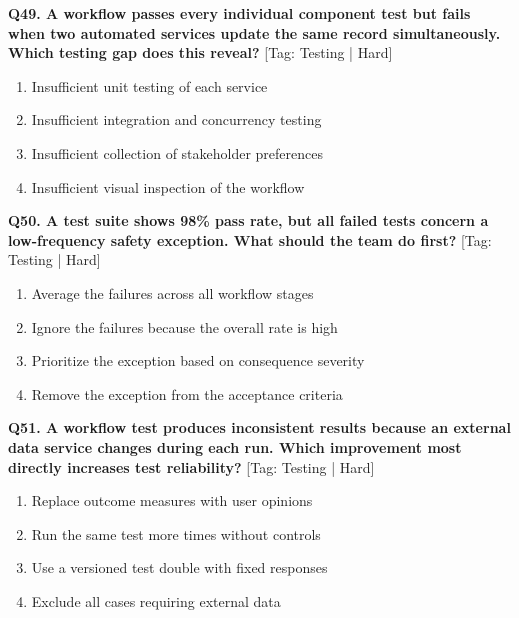 \noindent\textbf{Q49. A workflow passes every individual component test but fails when two automated services update the same record simultaneously. Which testing gap does this reveal?} \hfill [Tag: Testing | Hard]
\begin{enumerate}[label=(\alph*),topsep=2pt,itemsep=1pt,partopsep=0pt,parsep=0pt]
    \item {Insufficient unit testing of each service}
    \item {Insufficient integration and concurrency testing}
    \item {Insufficient collection of stakeholder preferences}
    \item {Insufficient visual inspection of the workflow}
\end{enumerate}
\vspace{2mm}

\noindent\textbf{Q50. A test suite shows 98\% pass rate, but all failed tests concern a low-frequency safety exception. What should the team do first?} \hfill [Tag: Testing | Hard]
\begin{enumerate}[label=(\alph*),topsep=2pt,itemsep=1pt,partopsep=0pt,parsep=0pt]
    \item {Average the failures across all workflow stages}
    \item {Ignore the failures because the overall rate is high}
    \item {Prioritize the exception based on consequence severity}
    \item {Remove the exception from the acceptance criteria}
\end{enumerate}
\vspace{2mm}

\noindent\textbf{Q51. A workflow test produces inconsistent results because an external data service changes during each run. Which improvement most directly increases test reliability?} \hfill [Tag: Testing | Hard]
\begin{enumerate}[label=(\alph*),topsep=2pt,itemsep=1pt,partopsep=0pt,parsep=0pt]
    \item {Replace outcome measures with user opinions}
    \item {Run the same test more times without controls}
    \item {Use a versioned test double with fixed responses}
    \item {Exclude all cases requiring external data}
\end{enumerate}
\vspace{2mm}

